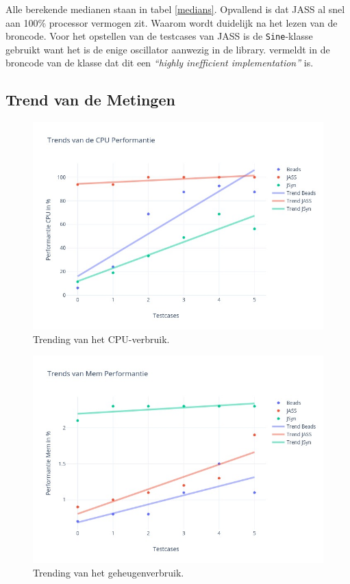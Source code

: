 Alle berekende medianen staan in tabel \ref{medians}. Opvallend is dat JASS al snel aan 100\% processor vermogen zit. Waarom wordt duidelijk na het lezen van de broncode. Voor het opstellen van de testcases van JASS is de \verb+Sine+-klasse gebruikt want het is de enige oscillator aanwezig in de library. \textcite{jasscode} vermeldt in de broncode van de klasse dat dit een \textit{``highly inefficient implementation''} is.

\subsection{Trend van de Metingen}

\begin{figure}
    		\centering
    		\includegraphics[width=0.75\linewidth]{medians/trendcpu}
    		\caption{Trending van het CPU-verbruik.}
    		\label{trendcpu}
\end{figure}

\begin{figure}
    		\centering
    		\includegraphics[width=0.75\linewidth]{medians/trendmem}
    		\caption{Trending van het geheugenverbruik.}
    		\label{trendmem}
\end{figure}

